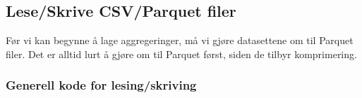 \subsection{Lese/Skrive CSV/Parquet filer}

Før vi kan begynne å lage aggregeringer, må vi gjøre datasettene om til Parquet filer. Det er alltid lurt å gjøre om til Parquet først, siden de tilbyr komprimering.

\subsubsection{Generell kode for lesing/skriving}
